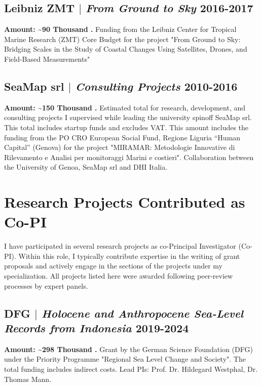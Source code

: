 \documentclass[11pt]{article}
\begin{document}
\subsection{Leibniz ZMT $|$ {\normalfont\textit{From Ground to Sky}} \hfill 2016-2017}
{\footnotesize \textbf{Amount: \textasciitilde90 Thousand \texteuro.} Funding from the Leibniz Center for Tropical Marine Research (ZMT) Core Budget for the project "From Ground to Sky: Bridging Scales in the Study of Coastal Changes Using Satellites, Drones, and Field-Based Measurements"}
\bigskip

\subsection{SeaMap srl $|$ {\normalfont\textit{Consulting Projects}} \hfill 2010-2016}
{\footnotesize \textbf{Amount: \textasciitilde150 Thousand \texteuro.} Estimated total for research, development, and consulting projects I supervised while leading the university spinoff SeaMap srl. This total includes startup funds and excludes VAT. This amount includes the funding from the PO CRO European Social Fund, Regione Liguria “Human Capital” (Genova) for the project "MIRAMAR: Metodologie Innovative di Rilevamento e Analisi per monitoraggi Marini e costieri". Collaboration between the University of Genoa, SeaMap srl and DHI Italia.}
\bigskip

\newpage
\section{Research Projects Contributed as Co-PI}
{\normalfont I have participated in several research projects as co-Principal Investigator (Co-PI). Within this role, I typically contribute expertise in the writing of grant proposals and actively engage in the sections of the projects under my specialization. All projects listed here were awarded following peer-review processes by expert panels.}\\

\subsection{DFG $|$ {\normalfont\textit{Holocene and Anthropocene Sea-Level Records from Indonesia}} \hfill 2019-2024}
{\footnotesize \textbf{Amount: \textasciitilde298 Thousand \texteuro.} Grant by the German Science Foundation (DFG) under the Priority Programme "Regional Sea Level Change and Society". The total funding includes indirect costs. Lead PIs: Prof. Dr. Hildegard Westphal, Dr. Thomas Mann.}
\bigskip
\end{document}
